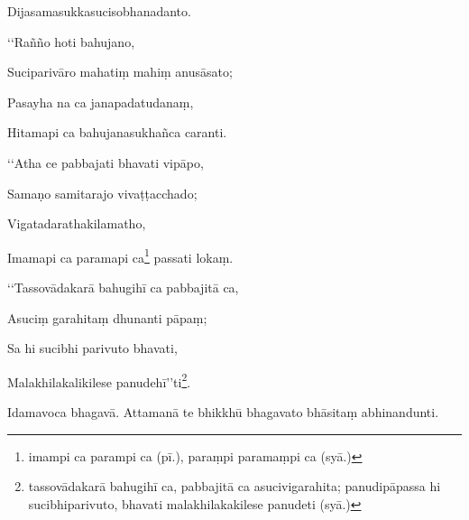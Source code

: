 Dijasamasukkasucisobhanadanto.

‘‘Rañño hoti bahujano,

Suciparivāro mahatiṃ mahiṃ anusāsato;

Pasayha na ca janapadatudanaṃ,

Hitamapi ca bahujanasukhañca caranti.

‘‘Atha ce pabbajati bhavati vipāpo,

Samaṇo samitarajo vivaṭṭacchado;

Vigatadarathakilamatho,

Imamapi ca paramapi ca\footnote{imampi ca parampi ca (pī.), paraṃpi paramaṃpi ca (syā.)} passati lokaṃ.

‘‘Tassovādakarā bahugihī ca pabbajitā ca,

Asuciṃ garahitaṃ dhunanti pāpaṃ;

Sa hi sucibhi parivuto bhavati,

Malakhilakalikilese panudehī’’ti\footnote{tassovādakarā bahugihī ca, pabbajitā ca asucivigarahita; panudipāpassa hi sucibhiparivuto, bhavati malakhilakakilese panudeti (syā.)}.

Idamavoca bhagavā. Attamanā te bhikkhū bhagavato bhāsitaṃ abhinandunti.

